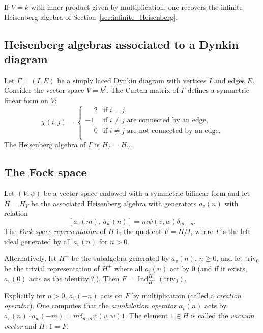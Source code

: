 \documentclass{ck-article}
\DeclareMathOperator\Ind{Ind}
\newcommand\triv{{\mathrm{triv}}}
\begin{document}
\begin{Example}
    If $V = k$ with inner product given by multiplication, one recovers the infinite Heisenberg algebra of Section~\ref{sec:infinite_Heisenberg}.
\end{Example}


\subsection{Heisenberg algebras associated to a Dynkin diagram}\label{sec:heisenberg:Dynkin}

Let $\Gamma = (I, E)$ be a simply laced Dynkin diagram with vertices $I$ and edges $E$.
Consider the vector space $V = k^I$.
The Cartan matrix of $\Gamma$ defines a symmetric linear form on $V$:
\[
    \chi(i,j) =
    \begin{cases}
        \phantom{-}2 & \text{if } i = j, \\
        -1 & \text{if } i \ne j \text{ are connected by an edge}, \\
        \phantom{-}0 & \text{if } i \ne j \text{ are not connected by an edge.} \\
    \end{cases}
\]
The Heisenberg algebra of $\Gamma$ is $H_\Gamma = H_V$.


\subsection{The Fock space}

Let $(V,\psi)$ be a vector space endowed with a symmetric bilinear form and let $H = H_V$ be the associated Heisenberg algebra with generators $a_v(n)$ with relation
\[
    [a_v(m),\, a_w(n)] = m\psi(v,w) \delta_{m,-n}.
\]
The \emph{Fock space representation} of $H$ is the quotient $F = H/I$, where $I$ is the left ideal generated by all $a_v(n)$ for $n > 0$.

Alternatively, let $H^+$ be the subalgebra generated by $a_v(n)$, $n \ge 0$, and let $\triv_0$ be the trivial representation of $H^+$ where all $a_i(n)$ act by $0$ (and if it exists, $a_v(0)$ acts as the identity[?]).
Then $F = \Ind_{H^+}^H(\triv_0)$.

Explicitly for $n > 0$, $a_v(-n)$ acts on $F$ by multiplication (called a \emph{creation operator}).
One computes that the \emph{annihilation operator} $a_v(n)$ acts by $a_v(n) \cdot a_w(-m) = m\delta_{n,m}\psi(v,w)1$.
The element $1 \in H$ is called the \emph{vacuum vector} and $H \cdot 1 = F$.
\end{document}
